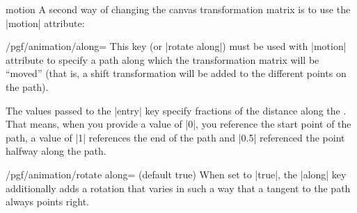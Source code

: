 \begin{animateattribute}{motion}
  A second way of changing the canvas transformation matrix is to use
  the |motion| attribute:
\begin{codeexample}[width=2.3cm]
\end{codeexample}


\begin{key}{/pgf/animation/along=}
  This key (or |rotate along|) must be used with |motion| attribute to
  specify a path along which the transformation matrix will be
  ``moved'' (that is, a shift transformation will be added to the
  different points on the path).

  The values passed to the |entry| key specify fractions of the
  distance along the . That means, when you provide a value
  of |0|, you reference the start point of the path, a value of |1|
  references the end of the path and |0.5| referenced the point
  halfway along the path.

\begin{codeexample}[width=2.3cm]
\end{codeexample}
\end{key}

  
\begin{key}{/pgf/animation/rotate along= (default true)}
  When set to |true|, the |along| key additionally adds a rotation
  that varies in such a way that a tangent to the path always points right. 

\begin{codeexample}[width=2.3cm]
\end{codeexample}  
\end{key}
\end{animateattribute}


